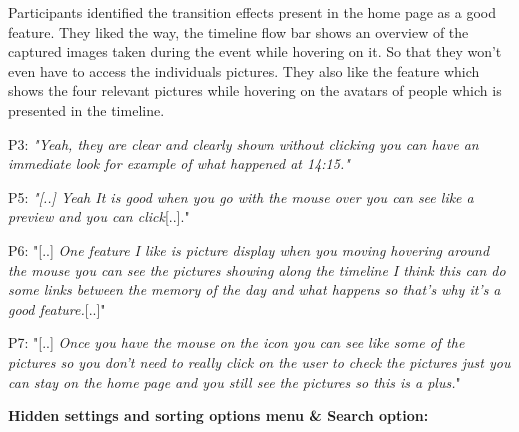 \documentclass[mscthesis]{usiinfthesis}
\begin{document}
Participants identified the transition effects present in the home page as a good feature. They liked the way, the timeline flow bar shows an overview of the captured images taken during the event while hovering on it. So that they won't even have to access the individuals pictures. They also like the feature which shows the four relevant pictures while hovering on the avatars of people which is presented in the timeline.
\newline
\begin{adjustwidth}{1cm}{1cm}
\hspace{\parindent}P3: \textit{"Yeah, they are clear and clearly shown without clicking you can have an immediate look for example of what happened at 14:15."}

P5: \textit{"[..] Yeah It is good when you go with the mouse over you can see like a preview and you can click}[..]."

P6: "[..] \textit{One feature I like is picture display when you moving hovering around the mouse you can see the pictures showing along the timeline I think this can do some links between the memory of the day and what happens so that's why it's a good feature.}[..]"

P7: "[..] \textit{Once you have the mouse on the icon you can see like some of the pictures so you don't need to really click on the user to check the pictures just you can stay on the home page and you still see the pictures so this is a plus.}"
\newline
\end{adjustwidth}

\textbf{Hidden settings and sorting options menu \& Search option:}
\end{document}
